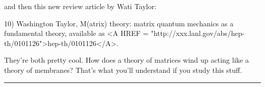 and then this new review article by Wati Taylor:

10) Washington Taylor, M(atrix) theory: matrix quantum mechanics as a
fundamental theory, available as <A HREF = "http://xxx.lanl.gov/abs/hep-th/0101126">hep-th/0101126</A>.


They're both pretty cool.  How does a theory of matrices wind up 
acting like a theory of membranes?  That's what you'll understand
if you study this stuff.








 \par\noindent\rule{\textwidth}{0.4pt}

